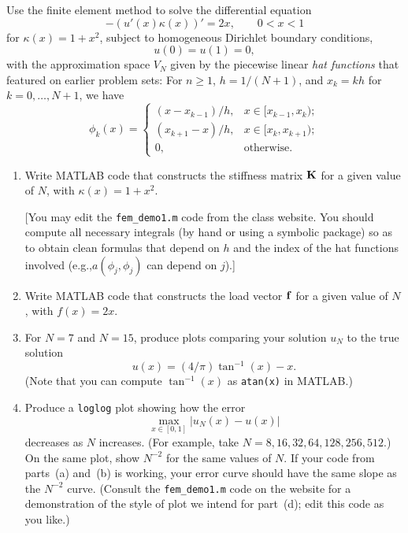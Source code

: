 Use the finite element method to solve the differential equation
\[ -(u'(x) \kappa(x))' = 2x, \qquad 0<x<1\]
for $\kappa(x) = 1+x^2$, subject to homogeneous Dirichlet boundary conditions,
\[ u(0) = u(1) = 0,\]
with the approximation space $V_N$ given by the piecewise linear
\emph{hat functions} that featured on earlier problem sets:
For $n\ge 1$,  $h = 1/(N+1)$,  and $x_k = kh$ for $k = 0, \ldots, N+1$,
we have 
\[ \phi_k(x) = \left\{ \begin{array}{ll}
           (x-x_{k-1})/h, & x\in [x_{k-1}, x_k);\\
           (x_{k+1}-x)/h, & x\in [x_k, x_{k+1});\\
            0,             & \mbox{otherwise}.
          \end{array}\right. \]

\begin{enumerate}
\item Write MATLAB code that constructs the stiffness matrix ${\bf K}$ for a given value of $N$,
      with $\kappa(x) = 1+x^2$.

      [You may edit the \verb|fem_demo1.m| code from the class website.
       You should compute all necessary integrals (by hand or using a symbolic package)
       so as to obtain clean formulas that depend on $h$ and the index of the hat functions
       involved (e.g.,$a(\phi_j, \phi_j)$ can depend on $j$).]

\vspace*{1em}
\item Write MATLAB code that constructs the load vector ${\bf f}$ for a given value of $N$, 
       with $f(x) = 2x$.  
         
\vspace*{1em}
\item For $N = 7$ and $N=15$, produce plots comparing your solution $u_N$
      to the true solution 
               \[ u(x) = (4/\pi) \tan^{-1}(x) - x. \]
      (Note that you can compute $\tan^{-1}(x)$ as {\tt atan(x)} in MATLAB.)
      
\vspace*{1em}
\item Produce a \verb|loglog| plot showing how the error 
      \[ \max_{x\in [0,1]} |u_N(x) - u(x)| \]
      decreases as $N$ increases.
      (For example, take $N=8,16,32,64,128, 256, 512$.)  
      On the same plot, show $N^{-2}$ for the same values of $N$.
      If your code from parts~(a) and~(b) is working, your error curve
      should have the same slope as the $N^{-2}$ curve.
      (Consult the \verb|fem_demo1.m| code on the website
      for a demonstration of the style of plot we intend for part~(d);
      edit this code as you like.)
\end{enumerate}

